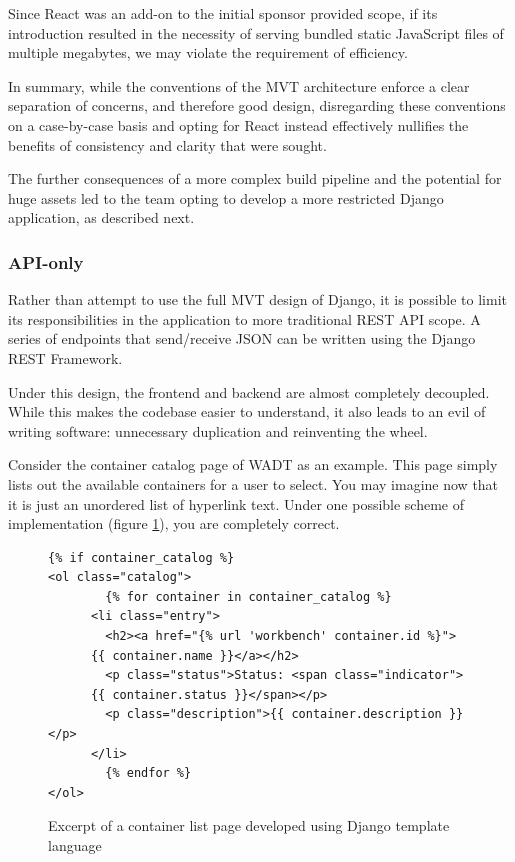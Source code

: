 \documentclass[12pt,titlepage]{article}
\begin{document}
Since React was an add-on to the initial sponsor provided scope, if its introduction resulted in the necessity of serving bundled static JavaScript files of multiple megabytes, we may violate the requirement of efficiency.

In summary, while the conventions of the MVT architecture enforce a clear separation of concerns, and therefore good design, disregarding these conventions on a case-by-case basis and opting for React instead effectively nullifies the benefits of consistency and clarity that were sought.

The further consequences of a more complex build pipeline and the potential for huge assets led to the team opting to develop a more restricted Django application, as described next.

\subsubsection{API-only}
Rather than attempt to use the full MVT design of Django, it is possible to limit its responsibilities in the application to more traditional REST API scope. A series of endpoints that send/receive JSON can be written using the Django REST Framework.

Under this design, the frontend and backend are almost completely decoupled. While this makes the codebase easier to understand, it also leads to an evil of writing software: unnecessary duplication and reinventing the wheel.

Consider the container catalog page of WADT as an example. This page simply lists out the available containers for a user to select. You may imagine now that it is just an unordered list of hyperlink text. Under one possible scheme of implementation (figure \ref{fig:templates}), you are completely correct.

\begin{figure}[htp]
	\begin{verbatim}
{% if container_catalog %}
<ol class="catalog">
        {% for container in container_catalog %}
      <li class="entry">
        <h2><a href="{% url 'workbench' container.id %}">
	  {{ container.name }}</a></h2>
        <p class="status">Status: <span class="indicator">
	  {{ container.status }}</span></p>
        <p class="description">{{ container.description }}</p>
      </li>
        {% endfor %}
</ol>
	\end{verbatim}
	\caption{Excerpt of a container list page developed using Django template language}
	\label{fig:templates}
\end{figure}
\end{document}
